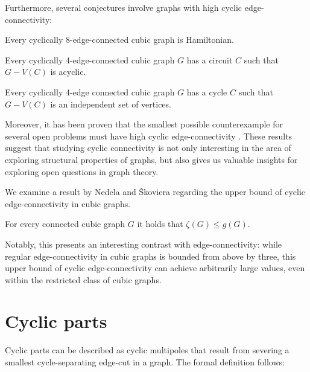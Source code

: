 \documentclass[12pt, twoside]{book}
\begin{document}
Furthermore, several conjectures involve graphs with high cyclic edge-connectivity:

\begin{conjecture}
	Every cyclically $8$-edge-connected cubic graph is Hamiltonian.
\end{conjecture}

\begin{conjecture}
	Every cyclically 4-edge-connected cubic graph $G$ has a circuit $C$ such that $G-V (C)$ is acyclic.
\end{conjecture}

\begin{conjecture}
	Every cyclically 4-edge connected cubic graph $G$ has a cycle $C$ such that $G-V(C)$ is an independent set of vertices.
\end{conjecture}

Moreover, it has been proven that the smallest possible counterexample for several open problems must have high cyclic edge-connectivity \cite{Macajova2020, Kochol2004}. These results suggest that studying cyclic connectivity is not only interesting in the area of exploring structural properties of graphs, but also gives us valuable insights for exploring open questions in graph theory.

We examine a result by Nedela and Škoviera regarding the upper bound of cyclic edge-connectivity in cubic graphs. 

\begin{proposition}\label{prop:cyclic-con-less-than-girth}
	For every connected cubic graph $G$ it holds that $\zeta(G)\leq g(G)$.
\end{proposition}

Notably, this presents an interesting contrast with edge-connectivity: while regular edge-connectivity in cubic graphs is bounded from above by three, this upper bound of cyclic edge-connectivity can achieve arbitrarily large values, even within the restricted class of cubic graphs.

\section{Cyclic parts}\label{sec:cyclic-parts}

Cyclic parts can be described as cyclic multipoles that result from severing a smallest cycle-separating edge-cut in a graph. The formal definition follows:
\end{document}
